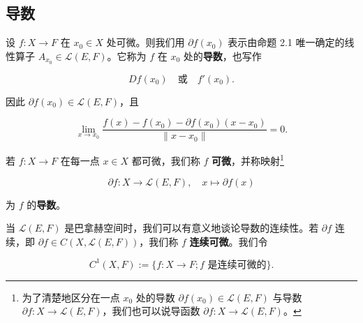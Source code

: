 \subsection*{导数}

设 $ f : X \to F $ 在 $ x_0 \in X $ 处可微。则我们用 $ \partial f(x_0) $ 表示由命题 2.1 唯一确定的线性算子 $ A_{x_0} \in \mathcal{L}(E, F) $。它称为 $ f $ 在 $ x_0 $ 处的\textbf{导数}，也写作

\[
Df(x_0) \quad \text{或} \quad f'(x_0) .
\]

因此 $ \partial f(x_0) \in \mathcal{L}(E, F) $，且

\[
\lim_{x \to x_0} \frac{f(x) - f(x_0) - \partial f(x_0)(x - x_0)}{\|x - x_0\|} = 0 .
\]

若 $ f : X \to F $ 在每一点 $ x \in X $ 都可微，我们称 $ f $ \textbf{可微}，并称映射\footnote{为了清楚地区分在一点 $ x_0 $ 处的导数 $ \partial f(x_0) \in \mathcal{L}(E, F) $ 与导数 $ \partial f : X \to \mathcal{L}(E, F) $，我们也可以说导函数 $ \partial f : X \to \mathcal{L}(E, F) $。}

\[
\partial f : X \to \mathcal{L}(E, F) , \quad x \mapsto \partial f(x)
\]

为 $ f $ 的\textbf{导数}。

当 $ \mathcal{L}(E, F) $ 是巴拿赫空间时，我们可以有意义地谈论导数的连续性。若 $ \partial f $ 连续，即 $ \partial f \in C(X, \mathcal{L}(E, F)) $，我们称 $ f $ \textbf{连续可微}。我们令

\[
C^1(X, F) := \{ f : X \to F ; f \text{ 是连续可微的} \} .
\]

